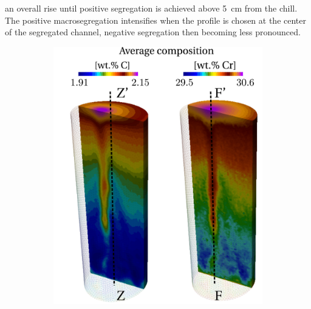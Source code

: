 an overall rise until positive segregation is achieved above \SI{5}{\centi\metre} from the chill. The positive macrosegregation 
intensifies when the profile is chosen at the center of the segregated channel, negative segregation then becoming less pronounced.
%
\begin{figure}[htbp]
\centering
  \begin{subfigure}[t]{0.4\textwidth}
    \centering
	\includegraphics[width=1.0\textwidth]{Chapter3/Graphics/multicomponent/interior/final_interior_ZZ_FF.pdf}
	\caption{}
    \label{fig:final_interior_ZZ_FF}
  \end{subfigure}
	\hfill  
  \begin{subfigure}[t]{0.55\textwidth}
    \centering

\end{subfigure}
\end{figure}
